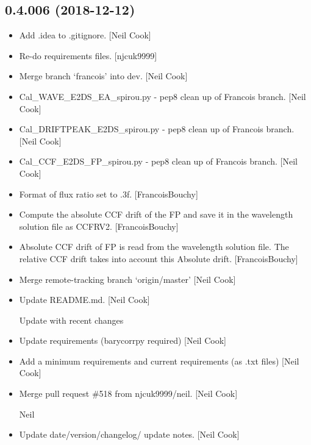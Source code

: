 \documentclass[a4paper,10pt,english]{report}
\begin{document}
\subsection{0.4.006 (2018-12-12)}
\label{\detokenize{misc/changelog:id236}}\begin{itemize}
\item {} 
Add .idea to .gitignore. {[}Neil Cook{]}

\item {} 
Re-do requirements files. {[}njcuk9999{]}

\item {} 
Merge branch ‘francois’ into dev. {[}Neil Cook{]}

\item {} 
Cal\_WAVE\_E2DS\_EA\_spirou.py - pep8 clean up of Francois branch. {[}Neil
Cook{]}

\item {} 
Cal\_DRIFTPEAK\_E2DS\_spirou.py - pep8 clean up of Francois branch. {[}Neil
Cook{]}

\item {} 
Cal\_CCF\_E2DS\_FP\_spirou.py - pep8 clean up of Francois branch. {[}Neil
Cook{]}

\item {} 
Format of flux ratio set to .3f. {[}FrancoisBouchy{]}

\item {} 
Compute the absolute CCF drift of the FP and save it in the wavelength
solution file as CCFRV2. {[}FrancoisBouchy{]}

\item {} 
Absolute CCF drift of FP is read from the wavelength solution file.
The relative CCF drift takes into account this Absolute drift.
{[}FrancoisBouchy{]}

\item {} 
Merge remote-tracking branch ‘origin/master’ {[}Neil Cook{]}

\item {} 
Update README.md. {[}Neil Cook{]}

Update with recent changes

\item {} 
Update requirements (barycorrpy required) {[}Neil Cook{]}

\item {} 
Add a minimum requirements and current requirements (as .txt files)
{[}Neil Cook{]}

\item {} 
Merge pull request \#518 from njcuk9999/neil. {[}Neil Cook{]}

Neil

\item {} 
Update date/version/changelog/ update notes. {[}Neil Cook{]}

\end{itemize}
\end{document}
